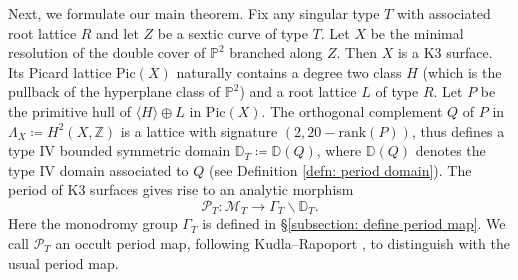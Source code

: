 \documentclass[12pt,reqno,a4paper]{amsart}
\theoremstyle{remark}
\theoremstyle{definition}
\newcommand{\ZZ}{\mathbb{Z}}
\newcommand{\PP}{\mathbb{P}}
\newcommand{\DD}{\mathbb{D}}
\newcommand{\Prd}{\mathscr{P}}
\newcommand{\calM}{\mathcal{M}}
\newcommand{\rank}{\mathrm{rank}}
\newcommand{\Pic}{\mathrm{Pic}}
\newcommand{\bs}{\backslash}
\begin{document}
Next, we formulate our main theorem. Fix any singular type $T$ with associated root lattice $R$ and let $Z$ be a sextic curve of type $T$. Let $X$ be the minimal resolution of the double cover of $\PP^2$ branched along $Z$. Then $X$ is a K3 surface. Its Picard lattice $\Pic(X)$ naturally contains a degree two class $H$ (which is the pullback of the hyperplane class of $\PP^2$) and a root lattice $L$ of type $R$. Let $P$ be the primitive hull of $\langle H\rangle\oplus L$ in $\Pic(X)$.
The orthogonal complement $Q$ of $P$ in $\Lambda_X\coloneqq H^2(X,\ZZ)$ is a lattice with signature $(2,20-\rank (P))$, thus defines a type IV bounded symmetric domain $\DD_T\coloneqq\DD(Q)$, where $\DD(Q)$ denotes the type IV domain associated to $Q$ (see Definition \ref{defn: period domain}).
The period of K3 surfaces gives rise to an analytic morphism
\[
\Prd_T\colon \calM_T\to \Gamma_T\bs\DD_T.
\]
Here the monodromy group $\Gamma_T$ is defined in \S\ref{subsection: define period map}. We call $\Prd_T$ an occult period map, following Kudla--Rapoport \cite{kudla2012occult}, to distinguish with the usual period map.
\end{document}
